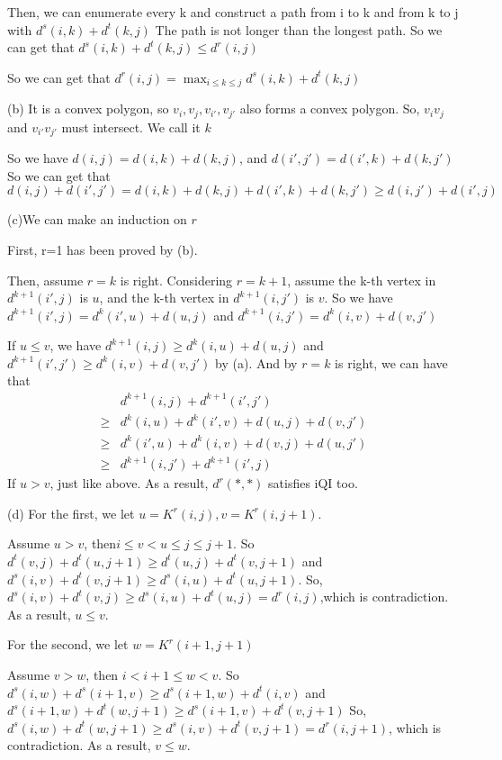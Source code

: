 \documentclass[UTF8]{ctexart}
\renewcommand{\(}{\left(}
\renewcommand{\)}{\right)}
\begin{document}
Then,  we can enumerate every k and construct a path from i to k and from k to j with $d^{s}(i,k) + d^{t}(k,j)$
The path is not longer than the longest path. So we can get that ${d^{s}(i,k) + d^{t}(k,j)} \leq d^{r}(i,j)$

So we can get that $d^{r}(i,j) = \max_{i \leq k \leq j}{d^{s}(i,k) + d^{t}(k,j)}$

(b) It is a convex polygon, so $v_{i}, v_{j}, v_{i'}, v_{j'}$ also forms a convex polygon.
So, $v_{i}v_{j}$ and $v_{i'}v_{j'}$ must intersect. We call it $k$

So we have $d(i,j) = d(i,k) + d(k,j)$, and $d(i',j') = d(i',k) + d(k,j')$
So we can get that $d(i,j) + d(i',j') = d(i,k) + d(k,j) + d(i',k) + d(k,j') \geq d(i,j') + d(i',j)$

(c)We can make an induction on $r$

First, r=1 has been proved by (b).

Then, assume $r=k$ is right. Considering $r=k+1$, assume the k-th vertex in $d^{k+1}(i',j)$ is $u$, and
the k-th vertex in $d^{k+1}(i,j')$ is $v$. So we have $d^{k+1}(i',j) = d^{k}(i',u) + d(u,j)$
and $d^{k+1}(i,j') = d^{k}(i,v) + d(v,j')$

If $u\leq v$, we have $d^{k+1}(i,j) \geq d^{k}(i,u) + d(u,j)$ and $d^{k+1}(i',j') \geq d^{k}(i,v) + d(v,j')$ by (a). 
And by $r=k$ is right, we can have that 
$$
\begin{aligned}
&d^{k+1}(i,j) + d^{k+1}(i',j') \\
\geq &d^{k}(i,u) + d^{k}(i',v) + d(u,j) +d(v,j') \\
\geq &d^{k}(i',u) + d^{k}(i,v) + d(v,j) +d(u,j') \\
\geq &d^{k+1}(i,j') + d^{k+1}(i',j)
\end{aligned}
$$
If $u > v$, just like above. 
As a result, $d^{r}(*,*)$ satisfies iQI too.

(d) For the first, we let $u=K^{r}(i,j), v=K^{r}(i,j+1)$. 

Assume $u>v$, then$i \leq v < u \leq j \leq j+1$. So $d^{t}(v,j) + d^{t}(u,j+1) \geq d^{t}(u,j) + d^{t}(v,j+1)$ 
and $d^{s}(i,v) + d^{t}(v,j+1) \geq d^{s}(i, u) + d^{t}(u,j+1)$.
So, $d^{s}(i,v) + d^{t}(v,j) \geq d^{s}(i,u) + d^{t}(u,j) = d^{r}(i,j)$,which is contradiction. 
As a result, $u \leq v$.

For the second, we let $w = K^{r}(i+1,j+1)$

Assume $v > w$, then $ i < i+1 \leq w < v $. So $d^{s}(i,w) + d^{s}(i+1,v) \geq d^{s}(i+1,w) + d^{t}(i,v)$
and $d^{s}(i+1,w) + d^{t}(w,j+1) \geq d^{s}(i+1,v) + d^{t}(v,j+1)$
So, $d^{s}(i,w) + d^{t}(w,j+1) \geq d^{s}(i,v) + d^{t}(v,j+1) = d^{r}(i,j+1)$, which is contradiction.
As a result, $v \leq w$.
\end{document}
